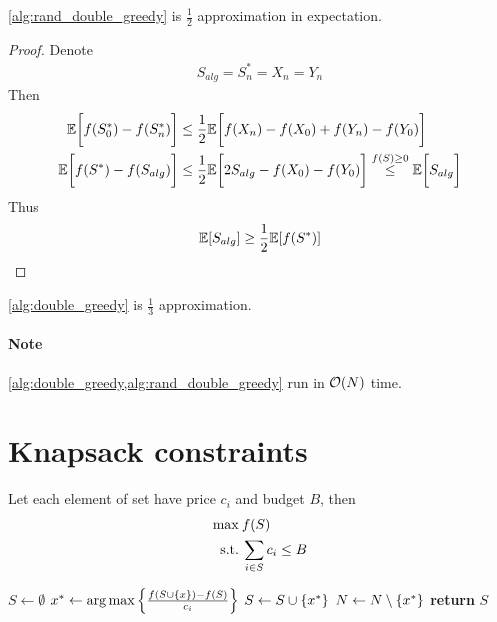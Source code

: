 \begin{theorem}
	\vref{alg:rand_double_greedy} is $\frac{1}{2}$ approximation in expectation.
	\begin{proof}
		Denote 
		\begin{align}
			S_{alg} = S^*_n=X_n=Y_n
		\end{align}
		Then
		\begin{align}
		\mathbb{E} \qty\bigg[f(S^*_{0}) - f(S^*_n)] &\leq \frac{1}{2} \mathbb{E} \qty\bigg[f(X_n) - f(X_{0})+f(Y_n) - f(Y_{0}) ]\\
		\mathbb{E} \qty\bigg[f(S^*) - f(S_{alg})] &\leq \frac{1}{2} \mathbb{E} \qty\bigg[2S_{alg} - f(X_{0}) - f(Y_{0}) ]\stackrel{f(S)\geq 0}{\leq} \mathbb{E} \qty\bigg[S_{alg} ]
		\end{align}
		Thus
		\begin{align}
		\mathbb{E} \qty[S_{alg} ] \geq\frac{1}{2}\mathbb{E} \qty[f(S^*)] 
		\end{align}
		
	\end{proof}

\begin{coll}
	\vref{alg:double_greedy} is $\frac{1}{3}$ approximation.
\end{coll}
\end{theorem}


\paragraph{Note} \vref{alg:double_greedy,alg:rand_double_greedy} run in $\order{N}$ time.


\section{Knapsack constraints}
Let each element of set have price $c_i$ and budget $B$, then
\begin{align}
\max \: & f(S)\\
\text{s.t.} \: & \sum_{i \in S} c_i \leq B
\end{align}


\begin{algorithm}
	\caption{}\label{alg:knapsack_greedy}
	\begin{algorithmic}[1]
		\State $S \gets \emptyset$
		\State $x^* \gets \arg \max \qty{ \frac{f(S\cup \qty{x})-f(S)}{c_i}}$
		\State $S\gets S \cup \qty{x^*}$
		\EndIf
		\State $N \gets N\setminus \qty{x^*}$
		\EndWhile
		\State \textbf{return} $S$
		\EndProcedure
	\end{algorithmic}
\end{algorithm}

